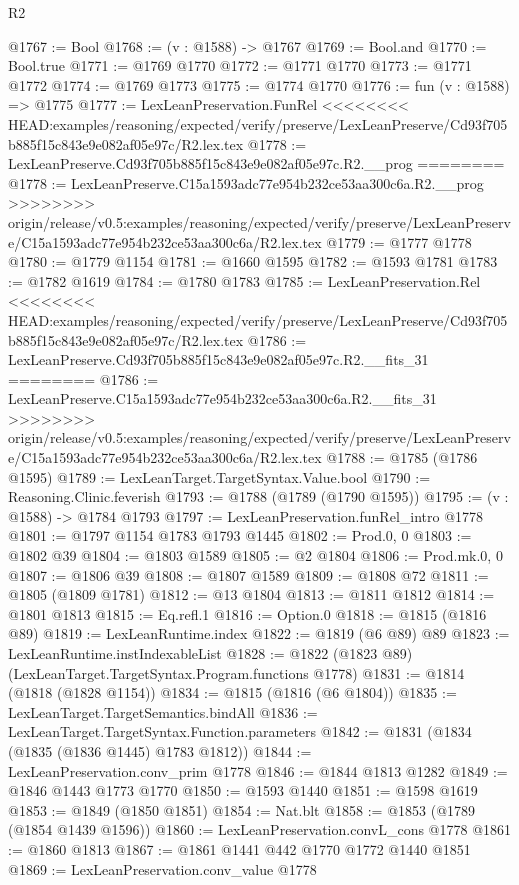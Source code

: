 \begin{lexlean}{R2}
\begin{coremodule}
{{{{{{{{{{{{{{{{{{{{{{{{{{{{{{{{{{{{{{{{{{{{{{{{{{{{{{{{{{{{{{{{{{{{{{{{{{{{{{{{{{{{{{{{{{{{@1767 := Bool
@1768 := (v : @1588) -> @1767
@1769 := Bool.and
@1770 := Bool.true
@1771 := @1769 @1770
@1772 := @1771 @1770
@1773 := @1771 @1772
@1774 := @1769 @1773
@1775 := @1774 @1770
@1776 := fun (v : @1588) => @1775
@1777 := LexLeanPreservation.FunRel
<<<<<<<< HEAD:examples/reasoning/expected/verify/preserve/LexLeanPreserve/Cd93f705b885f15c843e9e082af05e97c/R2.lex.tex
@1778 := LexLeanPreserve.Cd93f705b885f15c843e9e082af05e97c.R2.__prog
========
@1778 := LexLeanPreserve.C15a1593adc77e954b232ce53aa300c6a.R2.__prog
>>>>>>>> origin/release/v0.5:examples/reasoning/expected/verify/preserve/LexLeanPreserve/C15a1593adc77e954b232ce53aa300c6a/R2.lex.tex
@1779 := @1777 @1778
@1780 := @1779 @1154
@1781 := @1660 @1595
@1782 := @1593 @1781
@1783 := @1782 @1619
@1784 := @1780 @1783
@1785 := LexLeanPreservation.Rel
<<<<<<<< HEAD:examples/reasoning/expected/verify/preserve/LexLeanPreserve/Cd93f705b885f15c843e9e082af05e97c/R2.lex.tex
@1786 := LexLeanPreserve.Cd93f705b885f15c843e9e082af05e97c.R2.__fits_31
========
@1786 := LexLeanPreserve.C15a1593adc77e954b232ce53aa300c6a.R2.__fits_31
>>>>>>>> origin/release/v0.5:examples/reasoning/expected/verify/preserve/LexLeanPreserve/C15a1593adc77e954b232ce53aa300c6a/R2.lex.tex
@1788 := @1785 (@1786 @1595)
@1789 := LexLeanTarget.TargetSyntax.Value.bool
@1790 := Reasoning.Clinic.feverish
@1793 := @1788 (@1789 (@1790 @1595))
@1795 := (v : @1588) -> @1784 @1793
@1797 := LexLeanPreservation.funRel_intro @1778
@1801 := @1797 @1154 @1783 @1793 @1445
@1802 := Prod.{0, 0}
@1803 := @1802 @39
@1804 := @1803 @1589
@1805 := @2 @1804
@1806 := Prod.mk.{0, 0}
@1807 := @1806 @39
@1808 := @1807 @1589
@1809 := @1808 @72
@1811 := @1805 (@1809 @1781)
@1812 := @13 @1804
@1813 := @1811 @1812
@1814 := @1801 @1813
@1815 := Eq.refl.{1}
@1816 := Option.{0}
@1818 := @1815 (@1816 @89)
@1819 := LexLeanRuntime.index
@1822 := @1819 (@6 @89) @89
@1823 := LexLeanRuntime.instIndexableList
@1828 := @1822 (@1823 @89) (LexLeanTarget.TargetSyntax.Program.functions @1778)
@1831 := @1814 (@1818 (@1828 @1154))
@1834 := @1815 (@1816 (@6 @1804))
@1835 := LexLeanTarget.TargetSemantics.bindAll
@1836 := LexLeanTarget.TargetSyntax.Function.parameters
@1842 := @1831 (@1834 (@1835 (@1836 @1445) @1783 @1812))
@1844 := LexLeanPreservation.conv_prim @1778
@1846 := @1844 @1813 @1282
@1849 := @1846 @1443 @1773 @1770
@1850 := @1593 @1440
@1851 := @1598 @1619
@1853 := @1849 (@1850 @1851)
@1854 := Nat.blt
@1858 := @1853 (@1789 (@1854 @1439 @1596))
@1860 := LexLeanPreservation.convL_cons @1778
@1861 := @1860 @1813
@1867 := @1861 @1441 @442 @1770 @1772 @1440 @1851
@1869 := LexLeanPreservation.conv_value @1778
}}}}}}}}}}}}}}}}}}}}}}}}}}}}}}}}}}}}}}}}}}}}}}}}}}}}}}}}}}}}}}}}}}}}}}}}}}}}}}}}}}}}}}}}}}}}
\end{coremodule}
\end{lexlean}
